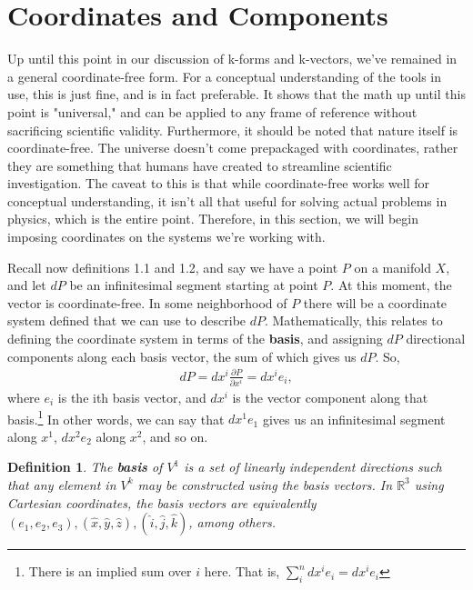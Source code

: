 \documentclass{book}
\newtheorem{defn}[equation]{Definition}
\begin{document}
\section{Coordinates and Components} 





Up until this point in our discussion of k-forms and k-vectors, we've remained in a general coordinate-free form. For a conceptual understanding of the tools in use, this is just fine, and is in fact preferable. It shows that the math up until this point is "universal," and can be applied to any frame of reference without sacrificing scientific validity. Furthermore, it should be noted that nature itself is coordinate-free. The universe doesn't come prepackaged with coordinates, rather they are something that humans have created to streamline scientific investigation. The caveat to this is that while coordinate-free works well for conceptual understanding, it isn't all that useful for solving actual problems in physics, which is the entire point. Therefore, in this section, we will begin imposing coordinates on the systems we're working with. 


Recall now definitions 1.1 and 1.2, and say we have a point $P$ on a manifold $X$, and let $dP$ be an infinitesimal segment starting at point $P$. At this moment, the vector is coordinate-free. In some neighborhood of $P$ there will be a coordinate system defined that we can use to describe $dP$. Mathematically, this relates to defining the coordinate system in terms of the \textbf{basis}, and assigning $dP$ directional components  along each basis vector, the sum of which gives us $dP$. So, \begin{gather}dP = dx^i \frac{\partial P}{\partial x^i} = dx^i e_i,\end{gather} where $e_i$ is the ith basis vector, and $dx^i$ is the vector component along that basis.\footnote{There is an implied sum over $i$ here. That is, $\sum_i^n dx^i e_i = dx^i e_i$} In other words, we can say that $dx^1e_1$ gives us an infinitesimal segment along $x^1$, $dx^2e_2$ along $x^2$, and so on. 


\begin{defn}
	The \textbf{basis} of $V^1$ is a set of linearly independent directions such that any element in $V^k$ may be constructed using the basis vectors. In $\mathbb{R}^3$ using Cartesian coordinates, the basis vectors are equivalently $(e_1, e_2, e_3), (\hat{x}, \hat{y}, \hat{z}), (\hat{i}, \hat{j}, \hat{k})$, among others. 
\end{defn}
\end{document}
